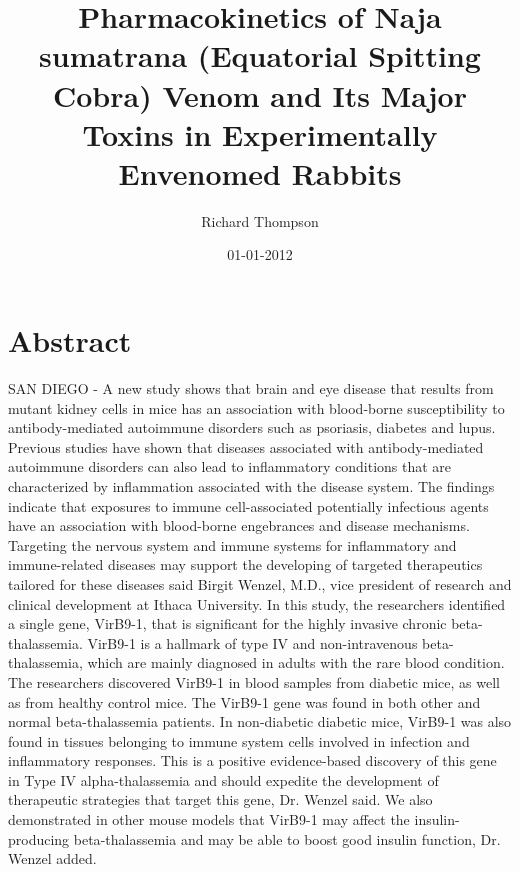 \documentclass{article}%
\title{Pharmacokinetics of Naja sumatrana (Equatorial Spitting Cobra) Venom and Its Major Toxins in Experimentally Envenomed Rabbits}%
\author{Richard Thompson}%
\affil{Department of Molecular and Human Genetics, Baylor College of Medicine, Houston, Texas, United States of America}%
\date{01{-}01{-}2012}%
\begin{document}
%
\normalsize%
\maketitle%
\section{Abstract}%
\label{sec:Abstract}%
SAN DIEGO {-} A new study shows that brain and eye disease that results from mutant kidney cells in mice has an association with blood{-}borne susceptibility to antibody{-}mediated autoimmune disorders such as psoriasis, diabetes and lupus.\newline%
Previous studies have shown that diseases associated with antibody{-}mediated autoimmune disorders can also lead to inflammatory conditions that are characterized by inflammation associated with the disease system. The findings indicate that exposures to immune cell{-}associated potentially infectious agents have an association with blood{-}borne engebrances and disease mechanisms.\newline%
Targeting the nervous system and immune systems for inflammatory and immune{-}related diseases may support the developing of targeted therapeutics tailored for these diseases said Birgit Wenzel, M.D., vice president of research and clinical development at Ithaca University.\newline%
In this study, the researchers identified a single gene, VirB9{-}1, that is significant for the highly invasive chronic beta{-}thalassemia. VirB9{-}1 is a hallmark of type IV and non{-}intravenous beta{-}thalassemia, which are mainly diagnosed in adults with the rare blood condition.\newline%
The researchers discovered VirB9{-}1 in blood samples from diabetic mice, as well as from healthy control mice. The VirB9{-}1 gene was found in both other and normal beta{-}thalassemia patients. In non{-}diabetic diabetic mice, VirB9{-}1 was also found in tissues belonging to immune system cells involved in infection and inflammatory responses.\newline%
This is a positive evidence{-}based discovery of this gene in Type IV alpha{-}thalassemia and should expedite the development of therapeutic strategies that target this gene, Dr. Wenzel said.\newline%
We also demonstrated in other mouse models that VirB9{-}1 may affect the insulin{-}producing beta{-}thalassemia and may be able to boost good insulin function, Dr. Wenzel added.\newline%
\end{document}
